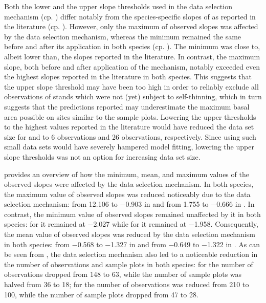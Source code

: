 Both the lower and the upper slope thresholds used in the data selection mechanism (cp. ) differ notably from the species-specific slopes of  as reported in the literature (cp. ).  However, only the maximum of observed slopes was affected by the data selection mechanism, whereas the minimum remained the same before and after its application in both species (cp. ).  The minimum was close to, albeit lower than, the slopes reported in the literature.  In contrast, the maximum slope, both before and after application of the mechanism, notably exceeded even the highest slopes reported in the literature in both species.   This suggests that the upper slope threshold may have been too high in order to reliably exclude all observations of stands which were not (yet) subject to self-thinning, which in turn suggests that the predictions reported may underestimate the maximum basal area possible on sites similar to the sample plots.  Lowering the upper thresholds to the highest values reported in the literature would have reduced the data set size for \Beech{} and \Spruce{} to \num{6} observations and \num{26} observations, respectively.  Since using such small data sets would have severely hampered model fitting, lowering the upper slope thresholds was not an option for increasing data set size.

 provides an overview of how the minimum, mean, and maximum values of the observed slopes were affected by the data selection mechanism.  In both species, the maximum value of observed slopes was reduced noticeably due to the data selection mechanism: from \num{12.106} to \num{-0.903} in \Beech{} and from \num{1.755} to \num{-0.666} in \Spruce{}.  In contrast, the minimum value of observed slopes remained unaffected by it in both species: for \Beech{} it remained at \num{-2.027} while for \Spruce{} it remained at \num{-1.958}.  Consequently, the mean value of observed slopes was reduced by the data selection mechanism in both species: from \num{-0.568} to \num{-1.327} in \Beech{} and from \num{-0.649} to \num{-1.322} in \Spruce{}.  As can be seen from , the data selection mechanism also led to a noticeable reduction in the number of observations and sample plots in both species: for \Beech{} the number of observations dropped from \num{148} to \num{63}, while the number of sample plots was halved from \num{36} to \num{18}; for \Spruce{} the number of observations was reduced from \num{210} to \num{100}, while the number of sample plots dropped from \num{47} to \num{28}.



